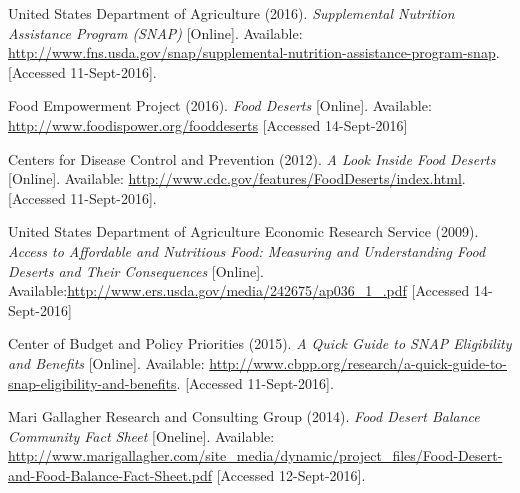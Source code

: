 \documentclass[11pt]{article}
\begin{document}
\pagebreak
\begin{thebibliography}{9}
    United States Department of Agriculture (2016).
    \textit{Supplemental Nutrition Assistance Program (SNAP)} [Online].
    Available: \url{http://www.fns.usda.gov/snap/supplemental-nutrition-assistance-program-snap}.
    [Accessed 11-Sept-2016].

    Food Empowerment Project (2016).
    \textit{Food Deserts} [Online].
    Available: \url{http://www.foodispower.org/fooddeserts}
    [Accessed 14-Sept-2016]

    Centers for Disease Control and Prevention (2012).
    \textit{A Look Inside Food Deserts} [Online].
    Available: \url{http://www.cdc.gov/features/FoodDeserts/index.html}.
    [Accessed 11-Sept-2016].

    United States Department of Agriculture Economic Research Service (2009).
    \textit{Access to Affordable and Nutritious Food: Measuring and Understanding Food Deserts and
    Their Consequences} [Online].
    Available:\url{http://www.ers.usda.gov/media/242675/ap036_1_.pdf}
    [Accessed 14-Sept-2016]

    Center of Budget and Policy Priorities (2015).
    \textit{A Quick Guide to SNAP Eligibility and Benefits} [Online].
    Available: \url{http://www.cbpp.org/research/a-quick-guide-to-snap-eligibility-and-benefits}.
    [Accessed 11-Sept-2016].

    Mari Gallagher Research and Consulting Group (2014).
    \textit{Food Desert Balance Community Fact Sheet} [Oneline].
    Available:
    \url{http://www.marigallagher.com/site_media/dynamic/project_files/Food-Desert-and-Food-Balance-Fact-Sheet.pdf}
    [Accessed 12-Sept-2016].

\end{thebibliography}
\end{document}
